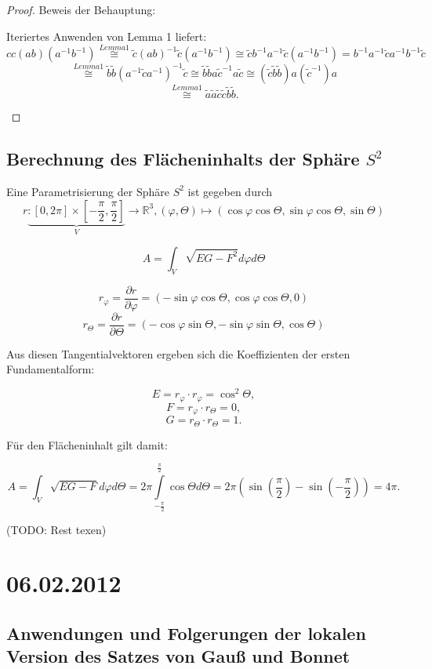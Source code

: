\documentclass[a4paper,11pt,notitlepage]{report}
\theoremstyle{definition}
\newcommand{\R}{{\ensuremath{\mathbb{R}}}}
\begin{document}
\begin{proof}{Beweis der Behauptung:}
\begin{enumerate}
		Iteriertes Anwenden von Lemma 1 liefert:
		$$cc(ab)(a^{-1}b^{-1}) \overset{Lemma 1}{\cong} \widetilde{c} (ab)^{-1} \widetilde{c} (a^{-1}b^{-1}) \cong \widetilde{c} b^{-1} a^{-1} \widetilde{c} (a^{-1} b^{-1}) = b^{-1}a^{-1}\widetilde{c} a^{-1} b^{-1} \widetilde{c}$$
		$$\overset{Lemma 1}{\cong} \widetilde{b} \widetilde{b} (a^{-1} \widetilde{c} a^{-1})^{-1} \widetilde{c} \cong \widetilde{b} \widetilde{b} a \widetilde{c}^{-1} a \widetilde{c} \cong (\widetilde{c} \widetilde{b} \widetilde{b}) a (\widetilde{c}^{-1}) a$$
		$$\overset{Lemma 1}{\cong} \widetilde{a} \widetilde{a} \widetilde{c} \widetilde{c} \widetilde{b} \widetilde{b}.$$
	\end{enumerate}
\end{proof}

\section{Berechnung des Flächeninhalts der Sphäre $S^2$}
Eine Parametrisierung der Sphäre $S^2$ ist gegeben durch
$$r \underbrace{\colon [0,2 \pi] \times [- \frac{\pi}{2}, \frac{\pi}{2}]}_{V} \rightarrow \R^3, (\varphi, \Theta) \mapsto (\cos \varphi \cos \Theta, \sin \varphi \cos \Theta, \sin \Theta)$$

$$\boxed{A = \int_V{\sqrt{EG - F^2} d \varphi d \Theta}}$$

$$r_\varphi = \frac{\partial r}{\partial \varphi} = (- \sin \varphi \cos \Theta, \cos \varphi \cos \Theta, 0)$$
$$r_\Theta = \frac{\partial r}{\partial \Theta} = (- \cos \varphi \sin \Theta, - \sin \varphi \sin \Theta, \cos \Theta)$$

Aus diesen Tangentialvektoren ergeben sich die Koeffizienten der ersten Fundamentalform:

$$E = r_\varphi \cdot r_\varphi = \cos^2 \Theta,$$
$$F = r_\varphi \cdot r_\Theta = 0,$$
$$G = r_\Theta \cdot r_\Theta = 1.$$

Für den Flächeninhalt gilt damit:

$$A = \int_V{\sqrt{EG-F} d \varphi d \Theta} = 2 \pi \int\limits_{-\frac{\pi}{2}}^{\frac{\pi}{2}}{\cos \Theta d \Theta} = 2 \pi \left(\sin \left(\frac{\pi}{2} \right) - \sin \left(-\frac{\pi}{2}\right) \right)= 4 \pi.$$

(TODO: Rest texen)

\chapter{06.02.2012}

\section{Anwendungen und Folgerungen der lokalen Version des Satzes von Gauß und Bonnet}
\end{document}

